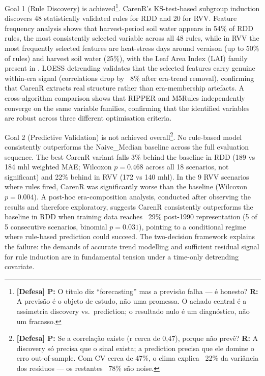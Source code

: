 Goal 1 (Rule Discovery) is achieved\footnote{\textbf{[Defesa] P:} O título diz ``forecasting'' mas a previsão falha --- é honesto? \textbf{R:} A previsão é o objeto de estudo, não uma promessa. O achado central é a assimetria discovery vs.\ prediction; o resultado nulo é um diagnóstico, não um fracasso.}. CarenR's KS-test-based subgroup induction discovers 48 statistically validated rules for RDD and 20 for RVV. Feature frequency analysis shows that harvest-period soil water appears in 54\% of RDD rules, the most consistently selected variable across all 48 rules, while in RVV the most frequently selected features are heat-stress days around veraison (up to 50\% of rules) and harvest soil water (25\%), with the Leaf Area Index (LAI) family present in . LOESS detrending validates that the selected features carry genuine within-era signal (correlations drop by ~8\% after era-trend removal), confirming that CarenR extracts real structure rather than era-membership artefacts. A cross-algorithm comparison shows that RIPPER and M5Rules independently converge on the same variable families, confirming that the identified variables are robust across three different optimisation criteria.

Goal 2 (Predictive Validation) is not achieved overall\footnote{\textbf{[Defesa] P:} Se a correlação existe (r cerca de 0,47), porque não prevê? \textbf{R:} A discovery só precisa que o sinal exista; a prediction precisa que ele domine o erro out-of-sample. Com CV cerca de 47\%, o clima explica ~22\% da variância dos resíduos --- os restantes ~78\% são noise.}. No rule-based model consistently outperforms the Naive\_Median baseline across the full evaluation sequence. The best CarenR variant falls 3\% behind the baseline in RDD (189 vs 184 mhl weighted MAE; Wilcoxon $p = 0.468$ across all 18 scenarios, not significant) and 22\% behind in RVV (172 vs 140 mhl). In the 9 RVV scenarios where rules fired, CarenR was significantly worse than the baseline (Wilcoxon $p = 0.004$). A post-hoc era-composition analysis, conducted after observing the results and therefore exploratory, suggests CarenR consistently outperforms the baseline in RDD when training data reaches ~29\% post-1990 representation (5 of 5 consecutive scenarios, binomial $p = 0.031$), pointing to a conditional regime where rule-based prediction could succeed. The two-decision framework explains the failure: the demands of accurate trend modelling and sufficient residual signal for rule induction are in fundamental tension under a time-only detrending covariate.

